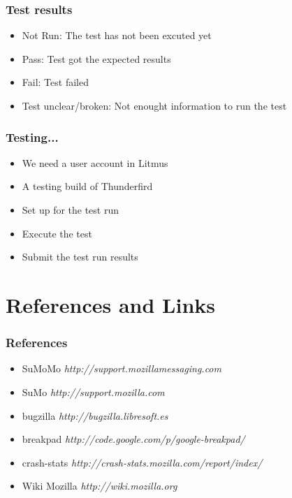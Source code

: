 \documentclass{beamer}
\begin{document}
\begin{frame}
\frametitle{Test results}
 \begin{itemize}
   \item Not Run: The test has not been excuted yet
   \item Pass: Test got the expected results
   \item Fail: Test failed
   \item Test unclear/broken: Not enought information to run the test
 \end{itemize}
\end{frame}


\begin{frame}
\frametitle{Testing...}
 \begin{itemize}
   \item We need a user account in Litmus
   \item A testing build of Thunderfird
   \item Set up for the test run
   \item Execute the test
   \item Submit the test run results
 \end{itemize}
\end{frame}




\section{References and Links}

\begin{frame}
 \frametitle{References}
 \begin{itemize}
    \item SuMoMo \textit{http://support.mozillamessaging.com}
    \item SuMo \textit{http://support.mozilla.com}
    \item bugzilla \textit{http://bugzilla.libresoft.es}
    \item breakpad \textit{http://code.google.com/p/google-breakpad/}
    \item crash-stats \textit{http://crash-stats.mozilla.com/report/index/}
    \item Wiki Mozilla \textit{http://wiki.mozilla.org}
  \end{itemize}

\end{frame}

\end{document}
